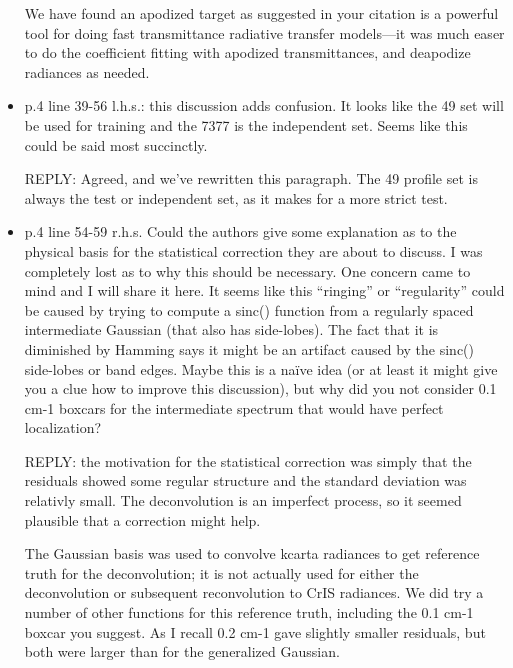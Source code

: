 \documentclass[11pt]{article}
\newcommand {\reply} {\mbox{\small REPLY}}
\begin{document}
\begin{itemize}
  We have found an apodized target as suggested in your citation is
  a powerful tool for doing fast transmittance radiative transfer
  models---it was much easer to do the coefficient fitting with
  apodized transmittances, and deapodize radiances as needed.
  

\item p.4 line 39-56 l.h.s.: this discussion adds confusion. It
  looks like the 49 set will be used for training and the 7377 is
  the independent set. Seems like this could be said most
  succinctly.

  \reply: Agreed, and we've rewritten this paragraph.  The 49
  profile set is always the test or independent set, as it makes for
  a more strict test.

\item p.4 line 54-59 r.h.s. Could the authors give some explanation
  as to the physical basis for the statistical correction they are
  about to discuss. I was completely lost as to why this should be
  necessary. One concern came to mind and I will share it here. It
  seems like this ``ringing'' or ``regularity'' could be caused by
  trying to compute a sinc() function from a regularly spaced
  intermediate Gaussian (that also has side-lobes). The fact that it
  is diminished by Hamming says it might be an artifact caused by
  the sinc() side-lobes or band edges. Maybe this is a naïve idea
  (or at least it might give you a clue how to improve this
  discussion), but why did you not consider 0.1 cm-1 boxcars for the
  intermediate spectrum that would have perfect localization?

  \reply: the motivation for the statistical correction was simply
  that the residuals showed some regular structure and the standard
  deviation was relativly small.  The deconvolution is an imperfect
  process, so it seemed plausible that a correction might help.

  The Gaussian basis was used to convolve kcarta radiances to get
  reference truth for the deconvolution; it is not actually used for
  either the deconvolution or subsequent reconvolution to CrIS
  radiances.  We did try a number of other functions for this
  reference truth, including the 0.1 cm-1 boxcar you suggest.  As I
  recall 0.2 cm-1 gave slightly smaller residuals, but both were
  larger than for the generalized Gaussian.


\end{itemize}
\end{document}
